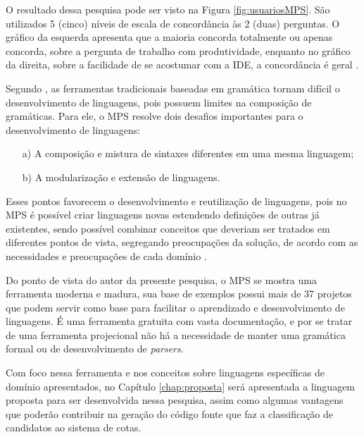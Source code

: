O resultado dessa pesquisa pode ser visto na Figura \ref{fig:usuariosMPS}. São utilizados 5 (cinco) níveis de escala de concordância às 2 (duas) perguntas. O gráfico da esquerda apresenta que a maioria concorda totalmente ou apenas concorda, sobre a pergunta de trabalho com produtividade, enquanto no gráfico da direita, sobre a facilidade de se acostumar com a \gls{IDE}, a concordância é geral \cite{voelter2014generic}.



Segundo , as ferramentas tradicionais baseadas em gramática tornam difícil o desenvolvimento de linguagens, pois possuem limites na composição de gramáticas. Para ele, o \gls{MPS} resolve dois desafios importantes para o desenvolvimento de linguagens: 
\begin{enumerate}
    \item[a)] A composição e mistura de sintaxes diferentes em uma mesma linguagem;
    \item[b)] A modularização e extensão de linguagens.
\end{enumerate}

Esses pontos favorecem o desenvolvimento e reutilização de linguagens, pois no \gls{MPS} é possível criar linguagens novas estendendo definições de outras já existentes, sendo possível combinar conceitos que deveriam ser tratados em diferentes pontos de vista, segregando preocupações da solução, de acordo com as necessidades e preocupações de cada domínio \cite{volter2011language}.

Do ponto de vista do autor da presente pesquisa, o \gls{MPS} se mostra uma ferramenta moderna e madura, sua base de exemplos possui mais de 37 projetos que podem servir como base para facilitar o aprendizado e desenvolvimento de linguagens. É uma ferramenta gratuita com vasta documentação, e por se tratar de uma ferramenta projecional não há a necessidade de manter uma gramática formal ou de desenvolvimento de \textit{parsers}.

Com foco nessa ferramenta e nos conceitos sobre linguagens específicas de domínio apresentados, no Capítulo \ref{chap:proposta} será apresentada a linguagem proposta para ser desenvolvida nessa pesquisa, assim como algumas vantagens que poderão contribuir na geração do código fonte que faz a classificação de candidatos ao sistema de cotas.